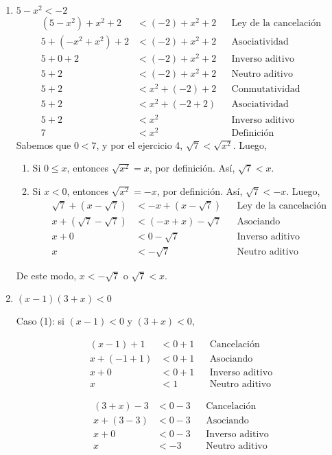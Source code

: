 \documentclass[11pt]{article}
\begin{document}
\begin{enumerate}
\begin{enumerate}[label=(\alph*)]
 \item $5-x^2<-2$
 \begin{align*}
  (5-x^2)+x^2+2 &< (-2)+x^2+2 && \text{Ley de la cancelación}\\
  5+(-x^2+x^2)+2 &< (-2)+x^2+2 && \text{Asociatividad}\\
  5+0+2 &< (-2)+x^2+2 && \text{Inverso aditivo}\\
  5+2 &< (-2)+x^2+2 && \text{Neutro aditivo}\\
  5+2 &< x^2+(-2)+2 && \text{Conmutatividad}\\
  5+2 &< x^2 + (-2+2) &&\text{Asociatividad}\\
  5+2 &< x^2&&\text{Inverso aditivo}\\
  7 &< x^2 && \text{Definición}
 \end{align*}
Sabemos que $0<7$, y por el ejercicio 4, $\sqrt{7}<\sqrt{x^2}$. Luego, \begin{enumerate}[label=\roman*)]
 \item Si $0\leq x$, entonces $\sqrt{x^2}=x$, por definición. Así, $\sqrt{7} < x$.
 \item Si $x<0$, entonces $\sqrt{x^2}=-x$, por definición. Así, $\sqrt{7} < -x$. Luego, \begin{align*}
  \sqrt{7} +(x -\sqrt{7})&< -x +(x - \sqrt{7}) && \text{Ley de la cancelación}\\
   x+(\sqrt{7} -\sqrt{7})&< (-x +x) - \sqrt{7} && \text{Asociando}\\
  x + 0 &< 0 - \sqrt{7} && \text{Inverso aditivo}\\
  x &< -\sqrt{7} && \text{Neutro aditivo}
 \end{align*}
\end{enumerate} De este modo, $x<-\sqrt{7}$ o $\sqrt{7} < x$.

\pagebreak

\item $(x-1)(3+x)<0$

Caso (1): si $(x-1)<0$ y $(3+x)<0$,

\noindent\begin{minipage}[l]{.5\linewidth}
 \begin{align*}
  (x-1) +1 &< 0 +1 && \text{Cancelación}\\
  x+(-1+1) &< 0 + 1 && \text{Asociando}\\
  x + 0 &< 0 +1 && \text{Inverso aditivo}\\
  x &< 1 && \text{Neutro aditivo}
 \end{align*} \end{minipage}%
 \begin{minipage}[l]{.5\linewidth}
  \begin{align*}
   (3+x) -3 &< 0 - 3 && \text{Cancelación}\\
   x + (3-3) &< 0 - 3 && \text{Asociando}\\
   x + 0 &< 0 - 3 && \text{Inverso aditivo}\\
   x &< - 3 && \text{Neutro aditivo}
  \end{align*}
 \end{minipage}


\end{enumerate}
\end{enumerate}
\end{document}
